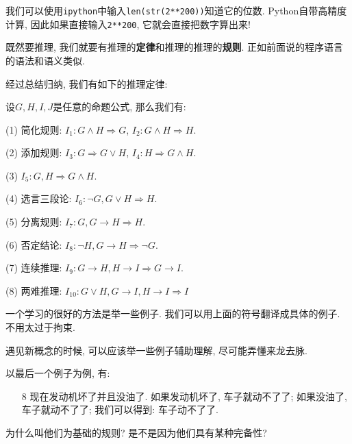 \begin{example}
	我们可以使用\texttt{ipython}中输入\texttt{len(str(2**200))}知道它的位数. Python自带高精度计算, 因此如果直接输入\texttt{2**200}, 它就会直接把数字算出来! 
\end{example} 

既然要推理, 我们就要有推理的\textbf{定律}和推理的推理的\textbf{规则}. 正如前面说的程序语言的语法和语义类似. 

经过总结归纳, 我们有如下的推理定律: 

\begin{theorem}[常见的推理定律]
	设$G,H,I,J$是任意的命题公式, 那么我们有: 
	
	(1) 简化规则: $I_1:G\land H\Rightarrow G$, $I_2: G\land H \Rightarrow H$.
	
	(2) 添加规则: $I_3:G\Rightarrow G\lor H$, $I_4: H\Rightarrow G\land H$.
	
	(3) $I_5: G,H\Rightarrow G\land H$.
	
	(4) 选言三段论: $I_6: \lnot G, G\lor H \Rightarrow H$.
	
	(5) 分离规则: $I_7: G,G\to H\Rightarrow H$.
	
	(6) 否定结论: $I_8: \lnot H, G\to H\Rightarrow \lnot G$.
	
	(7) 连续推理: $I_9: G\to H, H\to I\Rightarrow G\to I$.
	
	(8) 两难推理: $I_10: G\lor H,G\to I, H\to I\Rightarrow I$

\end{theorem}

一个学习的很好的方法是举一些例子. 我们可以用上面的符号翻译成具体的例子. 不用太过于拘束.  

\begin{idea}
	遇见新概念的时候, 可以应该举一些例子辅助理解, 尽可能弄懂来龙去脉. 
\end{idea}

以最后一个例子为例, 有: 

\begin{example}
	\begin{itemize}
		\item[8] 现在发动机坏了并且没油了. 如果发动机坏了, 车子就动不了了; 如果没油了, 车子就动不了了; 我们可以得到: 车子动不了了. 
	\end{itemize}
\end{example}

\begin{bonus}
	为什么叫他们为基础的规则? 是不是因为他们具有某种完备性? 
\end{bonus}


